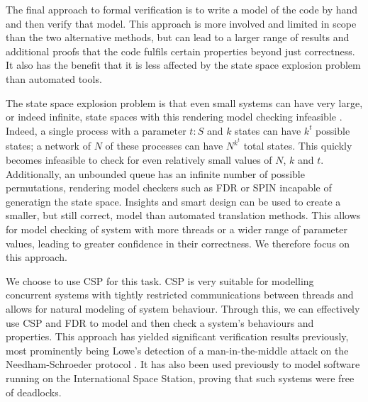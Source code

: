 The final approach to formal verification is to write a model of the code by hand and then verify that model. This approach is more involved and limited in scope than the two alternative methods, but can lead to a larger range of results and additional proofs that the code fulfils certain properties beyond just correctness. It also has the benefit that it is less affected by the state space explosion problem than automated tools. 

The state space explosion problem is that even small systems can have very large, or indeed infinite, state spaces with this rendering model checking infeasible \cite{StateSpace}. 
Indeed, a single process with a parameter $t : S$ and $k$ states can have $k^{t}$ possible states; a network of $N$ of these processes can have $N^{k^{t}}$ total states. This quickly becomes infeasible to check for even relatively small values of $N$, $k$ and $t$. Additionally, an unbounded queue has an infinite number of possible permutations, rendering model checkers such as FDR or SPIN \cite{SPIN} incapable of generatign the state space. Insights and smart design can be used to create a smaller, but still correct, model than automated translation methods. This allows for model checking of system with more threads or a wider range of parameter values, leading to greater confidence in their correctness. We therefore focus on this approach.




We choose to use CSP for this task. CSP is very suitable for modelling concurrent systems with tightly restricted communications between threads \cite{Lawrence2005} and allows for natural modeling of system behaviour. Through this, we can effectively use CSP and FDR to model and then check a system's behaviours and properties. This approach has yielded significant verification results previously, most prominently being Lowe's detection of a man-in-the-middle attack on the Needham-Schroeder protocol \cite{LoweNeedham}. It has also been used previously to model software running on the International Space Station, proving that such systems were free of deadlocks\cite{DeadlockAnalysis}. 

